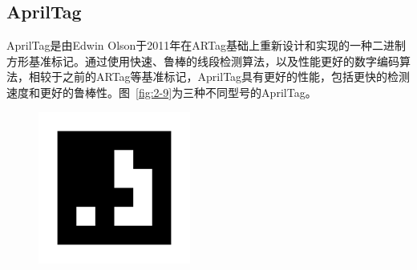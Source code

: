 \subsection{AprilTag}
AprilTag是由Edwin Olson于2011年在ARTag基础上重新设计和实现的一种二进制方形基准标记。通过使用快速、鲁棒的线段检测算法，以及性能更好的数字编码算法，相较于之前的ARTag等基准标记，AprilTag具有更好的性能，包括更快的检测速度和更好的鲁棒性。图~\ref{fig:2-9}为三种不同型号的AprilTag。

\clearpage
\begin{figure}[htb]
	\begin{minipage}[t]{0.33\linewidth}
		\centering
		\includegraphics[width=\columnwidth]{figures/2-9a.png} 
		\label{fig:2-9a} 
	\end{minipage}
	\begin{minipage}[t]{0.33\linewidth} 
		\centering

\end{minipage}
\end{figure}
